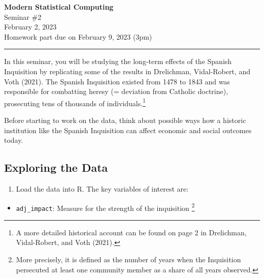 \documentclass[
]{report}
\author{}
\date{February 2, 2023}
\providecommand{\tightlist}{%
  \setlength{\itemsep}{0pt}\setlength{\parskip}{0pt}}\usepackage{longtable,booktabs,array}
\begin{document}
\ifdefined\Shaded\renewenvironment{Shaded}{\begin{tcolorbox}[enhanced, breakable, borderline west={3pt}{0pt}{shadecolor}, frame hidden, interior hidden, boxrule=0pt, sharp corners]}{\end{tcolorbox}}\fi

\begin{center}\vspace{0.3cm}
\textbf{\Large Modern Statistical Computing} \\
\vspace{5pt} {\large Seminar \#2} \\
\vspace{5pt} {\large February 2, 2023} \\
\vspace{5pt} {\large Homework part due on February 9, 2023 (3pm)} 
\end{center}

\flushleft

\rule{\linewidth}{0.1mm}

In this seminar, you will be studying the long-term effects of the
Spanish Inquisition by replicating some of the results in Drelichman,
Vidal-Robert, and Voth (2021). The Spanish Inquisition existed from 1478
to 1843 and was responsible for combatting heresy (= deviation from
Catholic doctrine), prosecuting tens of thousands of
individuals.\footnote{A more detailed historical account can be found on
  page 2 in Drelichman, Vidal-Robert, and Voth (2021).}

Before starting to work on the data, think about possible ways how a
historic institution like the Spanish Inquisition can affect economic
and social outcomes today.

\subsection{Exploring the Data}

\begin{enumerate}
\def\labelenumi{\arabic{enumi}.}
\tightlist
\item
  Load the data into R. The key variables of interest are:
\end{enumerate}

\begin{itemize}
\tightlist
\item
  \texttt{adj\_impact}: Measure for the strength of the inquisition
  \footnote{More precisely, it is defined as the number of years when
    the Inquisition persecuted at least one community member as a share
    of all years observed.}
\end{itemize}
\end{document}

